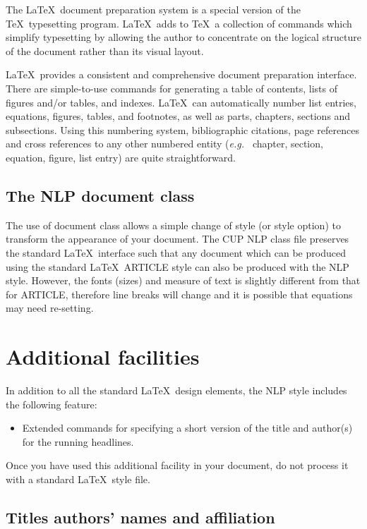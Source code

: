 \documentclass{CUP-JNL-NLP}
\begin{document}
The \LaTeX\ document preparation system is a special version of the
\TeX\ typesetting program. \LaTeX\ adds to \TeX\ a collection of
commands which simplify typesetting by allowing the author to
concentrate on the logical structure of the document rather than
its visual layout.

\LaTeX\ provides a consistent and comprehensive document preparation
interface. There are simple-to-use commands for generating a table of
contents, lists of figures and/or tables, and indexes. \LaTeX\ can
automatically number list entries, equations, figures, tables, and
footnotes, as well as parts, chapters, sections and subsections.
Using this numbering system, bibliographic citations, page references
and cross references to any other numbered entity ({\it e.g.\ } chapter,
section, equation, figure, list entry) are quite straightforward.

\subsection{The NLP document class}

The use of document class allows a simple change of style (or style option)
to transform the appearance of your document. The CUP NLP class file preserves
the standard \LaTeX\ interface such that any document which can be produced
using the standard \LaTeX\ ARTICLE style can also be produced with the
NLP style. However, the fonts (sizes) and measure of text is slightly different
from that for ARTICLE, therefore line breaks will change and it is possible
that equations may need re-setting.

\section{Additional facilities}

In addition to all the standard \LaTeX\ design elements, the NLP style
includes the following feature:
\begin{itemize}
  \item Extended commands for specifying a short version
        of the title and author(s) for the running
        headlines.
\end{itemize}
Once you have used this additional facility in your document,
do not process it with a standard \LaTeX\ style file.

\subsection{Titles authors' names and affiliation}
\end{document}
